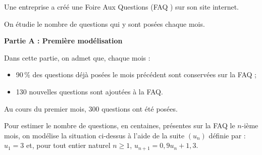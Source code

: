 \medskip

Une entreprise a créé une Foire Aux Questions (\og FAQ \fg) sur son site internet.



On étudie le nombre de questions qui y sont posées chaque mois.

\bigskip

\textbf{Partie A : Première modélisation}

\medskip

Dans cette partie, on admet que, chaque mois :

\begin{itemize}
\item[$\bullet~~$]90\,\% des questions déjà posées le mois précédent sont conservées sur la FAQ ;
\item[$\bullet~~$]130 nouvelles questions sont ajoutées à la FAQ.
\end{itemize}

Au cours du premier mois, $300$ questions ont été posées.



Pour estimer le nombre de questions, en centaines, présentes sur la FAQ le $n$-ième
mois, on modélise la situation ci-dessus à l'aide de la suite $\left(u_n\right)$ définie par : $u_1 =3$ et, pour tout entier naturel $n \geqslant 1$, $u_{n+1} = 0,9u_n + 1,3$.


